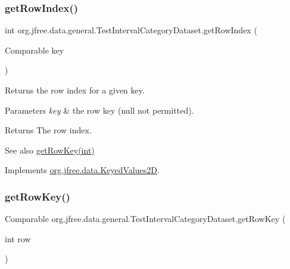 \subsubsection{\texorpdfstring{get\+Row\+Index()}{getRowIndex()}}
{\footnotesize\ttfamily int org.\+jfree.\+data.\+general.\+Test\+Interval\+Category\+Dataset.\+get\+Row\+Index (\begin{DoxyParamCaption}\item[{Comparable}]{key }\end{DoxyParamCaption})}

Returns the row index for a given key.


\begin{DoxyParams}{Parameters}
{\em key} & the row key ({\ttfamily null} not permitted).\\
\hline
\end{DoxyParams}
\begin{DoxyReturn}{Returns}
The row index.
\end{DoxyReturn}
\begin{DoxySeeAlso}{See also}
\mbox{\hyperlink{classorg_1_1jfree_1_1data_1_1general_1_1_test_interval_category_dataset_af8d67eac5f22766176eba84d80614940}{get\+Row\+Key(int)}} 
\end{DoxySeeAlso}


Implements \mbox{\hyperlink{interfaceorg_1_1jfree_1_1data_1_1_keyed_values2_d_ae92ded12999f2872687a5754ddf29254}{org.\+jfree.\+data.\+Keyed\+Values2D}}.

\mbox{\label{classorg_1_1jfree_1_1data_1_1general_1_1_test_interval_category_dataset_af8d67eac5f22766176eba84d80614940}} 
\subsubsection{\texorpdfstring{get\+Row\+Key()}{getRowKey()}}
{\footnotesize\ttfamily Comparable org.\+jfree.\+data.\+general.\+Test\+Interval\+Category\+Dataset.\+get\+Row\+Key (\begin{DoxyParamCaption}\item[{int}]{row }\end{DoxyParamCaption})}

